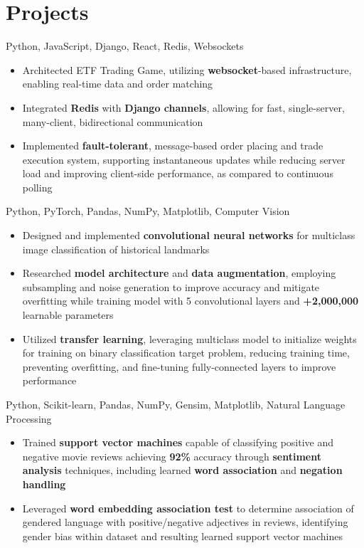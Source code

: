 \documentclass[letterpaper,11pt]{article}
\begin{document}
\section{Projects}
{Python, JavaScript, Django, React, Redis, Websockets}{}
\begin{itemize}
    \item Architected ETF Trading Game, utilizing \textbf{websocket}-based
          infrastructure, enabling real-time data and order matching
    \item Integrated \textbf{Redis} with \textbf{Django channels},
          allowing for fast, single-server, many-client, bidirectional
          communication
    \item Implemented \textbf{fault-tolerant}, message-based order
          placing and trade execution system, supporting instantaneous updates
          while reducing server load and improving client-side performance, as
          compared to continuous polling
\end{itemize}
{Python, PyTorch, Pandas, NumPy, Matplotlib, Computer Vision}{}
\begin{itemize}
    \item Designed and implemented \textbf{convolutional neural networks} for multiclass
          image classification of historical landmarks
    \item Researched \textbf{model architecture} and \textbf{data augmentation},
          employing subsampling and noise generation to improve accuracy and mitigate
          overfitting while training model with 5 convolutional layers and
          \textbf{+2,000,000} learnable parameters
    \item Utilized \textbf{transfer learning}, leveraging multiclass model to initialize
          weights for training on binary classification target problem, reducing training
          time, preventing overfitting, and fine-tuning fully-connected layers to improve
          performance
\end{itemize}
{Python, Scikit-learn, Pandas, NumPy, Gensim, Matplotlib, Natural Language Processing}{}
\begin{itemize}
    \item Trained \textbf{support vector machines} capable of classifying positive and
          negative movie reviews achieving \textbf{92\%} accuracy through
          \textbf{sentiment analysis} techniques, including learned \textbf{word
              association} and \textbf{negation handling}
    \item Leveraged \textbf{word embedding association test} to determine association of
          gendered language with positive/negative adjectives in reviews, identifying
          gender bias within dataset and resulting learned support vector machines
\end{itemize}
\end{document}
